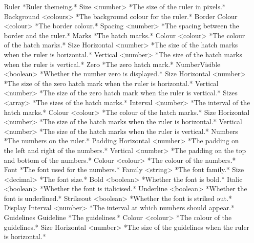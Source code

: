 \documentclass[
]{book}
\newenvironment{Shaded}{\begin{snugshade}}{\end{snugshade}}
\newcommand{\AttributeTok}[1]{\textcolor[rgb]{0.77,0.63,0.00}{#1}}
\begin{document}
\begin{Shaded}
\begin{Highlighting}[]
\AttributeTok{Ruler *Ruler themeing.*}
\AttributeTok{  Size <number> *The size of the ruler in pixels.*}
\AttributeTok{  Background <colours> *The background colour for the ruler.*}
\AttributeTok{  Border}
\AttributeTok{    Colour <colour> *The border colour.*}
\AttributeTok{    Spacing <number> *The spacing between the border and the ruler.*}
\AttributeTok{  Marks *The hatch marks.*}
\AttributeTok{    Colour <colour> *The colour of the hatch marks.*}
\AttributeTok{    Size}
\AttributeTok{      Horizontal <number> *The size of the hatch marks when the ruler is horizontal.*}
\AttributeTok{      Vertical <number> *The size of the hatch marks when the ruler is vertical.*}
\AttributeTok{    Zero *The zero hatch mark.*}
\AttributeTok{        NumberVisible <boolean> *Whether the number zero is displayed.*}
\AttributeTok{        Size}
\AttributeTok{          Horizontal <number> *The size of the zero hatch mark when the ruler is horizontal.*}
\AttributeTok{          Vertical <number> *The size of the zero hatch mark when the ruler is vertical.*}
\AttributeTok{    Sizes <array> *The sizes of the hatch marks.*}
\AttributeTok{      Interval <number> *The interval of the hatch marks.*}
\AttributeTok{      Colour <colour> *The colour of the hatch marks.*}
\AttributeTok{      Size}
\AttributeTok{        Horizontal <number> *The size of the hatch marks when the ruler is horizontal.*}
\AttributeTok{        Vertical <number> *The size of the hatch marks when the ruler is vertical.*}
\AttributeTok{  Numbers *The numbers on the ruler.*}
\AttributeTok{    Padding}
\AttributeTok{      Horizontal <number> *The padding on the left and right of the numbers.*}
\AttributeTok{      Vertical <number> *The padding on the top and bottom of the numbers.*}
\AttributeTok{    Colour <colour> *The colour of the numbers.*}
\AttributeTok{    Font *The font used for the numbers.*}
\AttributeTok{      Family <string> *The font family.*}
\AttributeTok{      Size <decimal> *The font size.*}
\AttributeTok{      Bold <boolean> *Whether the font is bold.*}
\AttributeTok{      Italic <boolean> *Whether the font is italicised.*}
\AttributeTok{      Underline <boolean> *Whether the font is underlined.*}
\AttributeTok{      Strikeout <boolean> *Whether the font is striked out.*}
\AttributeTok{    Display}
\AttributeTok{      Interval <number> *The interval at which numbers should appear.*}
\AttributeTok{  Guidelines}
\AttributeTok{    Guideline *The guidelines.*}
\AttributeTok{      Colour <colour> *The colour of the guidelines.*}
\AttributeTok{      Size}
\AttributeTok{        Horizontal <number> *The size of the guidelines when the ruler is horizontal.*}

\end{Highlighting}
\end{Shaded}
\end{document}
